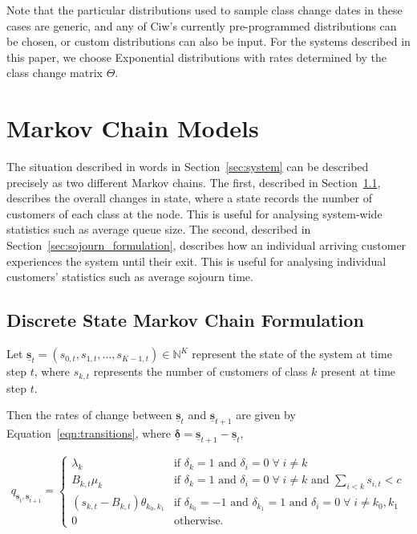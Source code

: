 \documentclass{article}
\begin{document}
Note that the particular distributions used to sample class change dates in
these cases are generic, and any of Ciw's currently pre-programmed distributions
can be chosen, or custom distributions can also be input. For the systems
described in this paper, we choose Exponential distributions with rates
determined by the class change matrix $\Theta$.




\section{Markov Chain Models}\label{sec:makovchains}
The situation described in words in Section~\ref{sec:system} can be described
precisely as two different Markov chains.
The first, described in Section~\ref{sec:state_formulation}, describes the
overall changes in state, where a state records the number of customers of each
class at the node. This is useful for analysing system-wide statistics such as
average queue size.
The second, described in Section~\ref{sec:sojourn_formulation}, describes how an
individual arriving customer experiences the system until their exit. This is
useful for analysing individual customers' statistics such as average sojourn
time.


\subsection{Discrete State Markov Chain Formulation}\label{sec:state_formulation}
Let
$\underline{\mathbf{s}}_t = (s_{0,t}, s_{1,t}, \dots, s_{K-1,t}) \in \mathbb{N}^K$
represent the state of the system at time step $t$, where $s_{k,t}$ represents
the number of customers of class $k$ present at time step $t$.

Then the rates of change between $\underline{\mathbf{s}}_t$ and
$\underline{\mathbf{s}}_{t+1}$ are given by Equation~\ref{eqn:transitions},
where $\underline{\mathbf{\delta}} = \underline{\mathbf{s}}_{t+1} - \underline{\mathbf{s}}_t$,

\begin{equation}\label{eqn:transitions}
q_{\underline{\mathbf{s}}_t, \underline{\mathbf{s}}_{t+1}} = 
\begin{cases}
\lambda_k & \text{if } \delta_k = 1 \text{ and } \delta_i = 0 \; \forall \; i \neq k \\
B_{k,t} \mu_k & \text{if } \delta_k = 1 \text{ and } \delta_i = 0 \; \forall \; i \neq k \text{ and } \sum_{i < k} s_{i,t} < c \\
(s_{k,t} - B_{k,t}) \theta_{k_0,k_1} & \text{if } \delta_{k_0} = -1 \text{ and } \delta_{k_1} = 1 \text{ and } \delta_i = 0 \; \forall \; i \neq k_0, k_1 \\
0 & \text{otherwise.}
\end{cases}
\end{equation}
\end{document}
